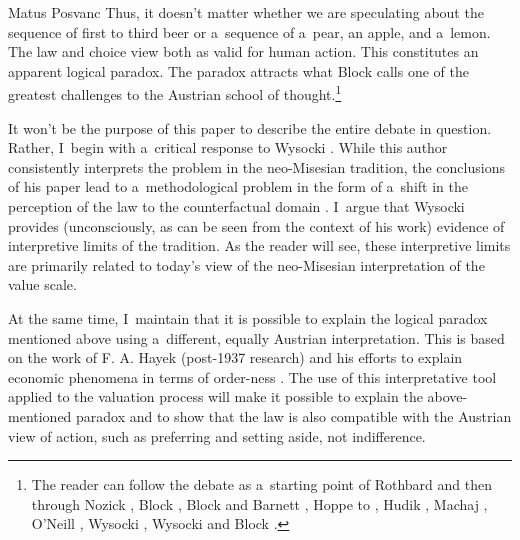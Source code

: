 \begin{artengenv}{Matus Posvanc}
Thus, it doesn't matter whether we are speculating about the sequence of first to third beer or a~sequence of a~pear, an apple, and a~lemon. The law and choice view both as valid for human action. This constitutes an apparent logical paradox. The paradox attracts what Block 
\parencite*[][]{Block1980On} %
 calls one of the greatest challenges to the Austrian school of thought.\footnote{The reader can follow the debate as a~starting point of Rothbard 
\parencite*[][]{Rothbard1997Toward} %
 and then through Nozick 
\parencite*[][]{Nozick1977On}, %
 Block 
\parencites*[][]{Block1980On}[][]{Block2009Rejoinder}[][]{Block2012Response}, %
 Block and Barnett 
\parencite*[][]{Block2010Rejoinder}, %
 Hoppe to 
\parencites*[][]{Hoppe2005Must}[][]{Hoppe2009Further}, %
 Hudik 
\parencite*[][]{Hudik2011note}, %
 Machaj 
\parencite*[][]{Machaj2007praxeological}, %
 O'Neill 
\parencite*[][]{ONeill2010Choice}, %
 Wysocki 
\parencites*[][]{Wysocki2016Indifference}[][]{Wysocki2021problem}, %
 Wysocki and Block 
\parencites*[][]{Wysocki2018analysis}[][]{Wysocki2019Homogeneity}.%
}



It won't be the purpose of this paper to describe the entire debate in question. Rather, I~begin with a~critical response to Wysocki 
\parencite*[][]{Wysocki2021problem}. %
 While this author consistently interprets the problem in the neo-Misesian tradition, the conclusions of his paper lead to a~methodological problem in the form of a~shift in the perception of the law to the counterfactual domain 
\parencite[][pp.41–42]{Wysocki2021problem}. %
 I~argue that Wysocki 
\parencite*[][]{Wysocki2021problem} %
 provides (unconsciously, as can be seen from the context of his work) evidence of interpretive limits of the tradition. As the reader will see, these interpretive limits are primarily related to today's view of the neo-Misesian interpretation of the value scale.



At the same time, I~maintain that it is possible to explain the logical paradox mentioned above using a~different, equally Austrian interpretation. This is based on the work of F. A. Hayek (post-1937 research) and his efforts to explain economic phenomena in terms of order-ness 
\parencites[see e.g.,][]{Caldwell2014Introduction}[][]{Lewis2015Orders}. %
 The use of this interpretative tool applied to the valuation process will make it possible to explain the above-mentioned paradox and to show that the law is also compatible with the Austrian view of action, such as preferring and setting aside, not indifference.




\end{artengenv}
